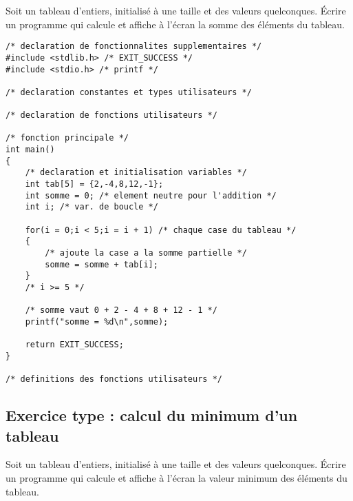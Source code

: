 Soit un tableau d'entiers, initialisé à une taille et des
valeurs quelconques. Écrire un programme qui calcule et affiche à
l'écran la somme des éléments du tableau.

\begin{correction}
\begin{verbatim}
/* declaration de fonctionnalites supplementaires */
#include <stdlib.h> /* EXIT_SUCCESS */
#include <stdio.h> /* printf */

/* declaration constantes et types utilisateurs */

/* declaration de fonctions utilisateurs */

/* fonction principale */
int main()
{
    /* declaration et initialisation variables */
    int tab[5] = {2,-4,8,12,-1};
    int somme = 0; /* element neutre pour l'addition */
    int i; /* var. de boucle */

    for(i = 0;i < 5;i = i + 1) /* chaque case du tableau */
    {
        /* ajoute la case a la somme partielle */
        somme = somme + tab[i];
    }
    /* i >= 5 */

    /* somme vaut 0 + 2 - 4 + 8 + 12 - 1 */
    printf("somme = %d\n",somme);

    return EXIT_SUCCESS;
}

/* definitions des fonctions utilisateurs */
\end{verbatim}
\end{correction}

\subsection{Exercice type : calcul du minimum d'un tableau}
 
Soit un tableau d'entiers, initialisé à une taille et des
valeurs quelconques. Écrire un programme qui calcule et affiche à
l'écran la valeur minimum des éléments du tableau. 

